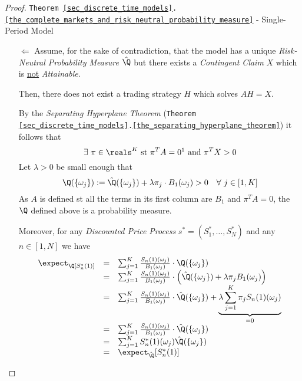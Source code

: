 \documentclass[11pt,a4paper]{article}
\begin{document}
\begin{proof}{\texttt{Theorem \ref{sec_discrete_time_models}.\ref{the_complete_markets_and_risk_neutral_probability_measure}} - Single-Period Model}
\begin{itemize}
\[\begin{array}{rcl}
        &=&\expect_{\hat\Q}[X/B_1]=\expect_{\hat\Q}[V_0]\\
        \implies\ \expect_\Q[V_0]&\neq&\expect_{\hat\Q}[V_0]
      \end{array}\]
      This contradicts \texttt{Proof \ref{sec_discrete_time_models}.\ref{prf_risk_neutral_valuation_principle}}  when we showed that if $X$ is attainable then $\expect_\Q[V_0]$ is the same for all $\Q\in\mathbb{M}$.
      \par Thus, if the model is \textit{Complete} then it has a unique \textit{Risk-Neutral Probability Measure}.
      \item[$\Longleftarrow$] Assume, for the sake of contradiction, that the model has a unique \textit{Risk-Neutral Probability Measure} $\hat\Q$ but there exists a \textit{Contingent Claim} $X$ which is \underline{not} \textit{Attainable}.
      \par Then, there does not exist a trading strategy $H$ which solves $AH=X$.
      \par By the \textit{Separating Hyperplane Theorem} (\texttt{Theorem \ref{sec_discrete_time_models}.\ref{the_separating_hyperplane_theorem}}) it follows that
      \[ \exists\ \pi\in\reals^K\text{ st }\pi^TA=0\footnotemark\text{ and }\pi^TX>0 \]
      Let $\lambda>0$ be small enough that
      \[ \Q(\{\omega_j\}):=\hat\Q(\{\omega_j\})+\lambda\pi_j\cdot B_1(\omega_j)>0\quad\forall\ j\in[1,K] \]
      As $A$ is defined st all the terms in its first column are $B_1$ and $\pi^TA=0$, the $\Q$ defined above is a probability measure.
      \par Moreover, for any \textit{Discounted Price Process} $s^*=(S_1^*,\dots,S_N^*)$ and any $n\in[1,N]$ we have
      \[\begin{array}{rcl}
        \expect_\Q[S_n^*(1)]&=&\sum_{j=1}^K\frac{S_n(1)(\omega_j)}{B_1(\omega_j)}\cdot\Q(\{\omega_j\})\\
        &=&\sum_{j=1}^K\frac{S_n(1)(\omega_j)}{B_1(\omega_j)}\cdot\left(\hat\Q(\{\omega_j\})+\lambda\pi_jB_1(\omega_j)\right)\\
        &=&\sum_{j=1}^K\frac{S_n(1)(\omega_j)}{B_1(\omega_j)}\cdot\hat\Q(\{\omega_j\})+\underbrace{\lambda\sum_{j=1}^K\pi_jS_n(1)(\omega_j)}_{=0}\\
        &=&\sum_{j=1}^K\frac{S_n(1)(\omega_j)}{B_1(\omega_j)}\cdot\hat\Q(\{\omega_j\})\\
        &=&\sum_{j=1}^KS_n^*(1)(\omega_j)\hat\Q(\{\omega_j\})\\
        &=&\expect_{\hat\Q}[S_n^*(1)]\\

\end{array}\]
\end{itemize}
\end{proof}
\end{document}
